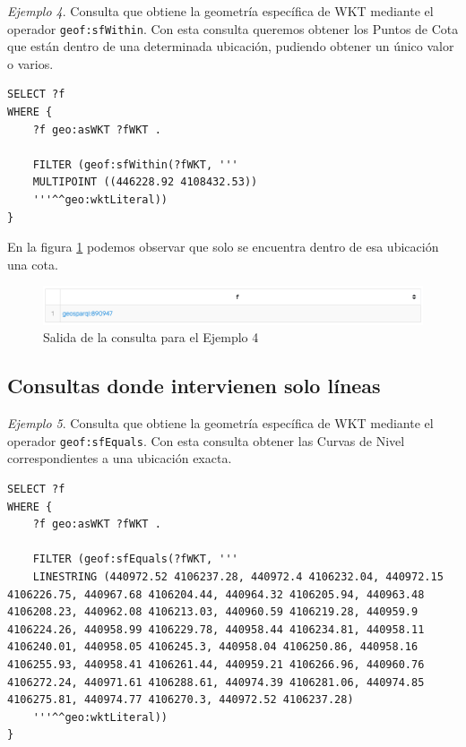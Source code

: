 \textit{Ejemplo 4}. Consulta que obtiene la geometría específica de WKT mediante el operador \texttt{geof:sfWithin}. Con esta consulta queremos obtener los Puntos de Cota que están dentro de una determinada ubicación, pudiendo obtener un único valor o varios. 

\vspace*{0.2cm}

\begin{lstlisting}
SELECT ?f
WHERE {
	?f geo:asWKT ?fWKT .
	
	FILTER (geof:sfWithin(?fWKT, '''
	MULTIPOINT ((446228.92 4108432.53))
	'''^^geo:wktLiteral))
} 
\end{lstlisting}

En la figura \ref{fig:salida7} podemos observar que solo se encuentra dentro de esa ubicación una cota.

\begin{figure}[H]
	\centering
	\includegraphics[width=1\linewidth]{imagenes/capitulo5/salida7}
	\caption{Salida de la consulta para el Ejemplo 4}
	\label{fig:salida7}
\end{figure}

\subsection{Consultas donde intervienen solo líneas}

\textit{Ejemplo 5}. Consulta que obtiene  la geometría específica de WKT mediante el operador \texttt{geof:sfEquals}. Con esta consulta obtener las Curvas de Nivel correspondientes a una ubicación exacta.

\vspace*{0.2cm}

\begin{lstlisting}
SELECT ?f
WHERE {
	?f geo:asWKT ?fWKT .
	
	FILTER (geof:sfEquals(?fWKT, '''
	LINESTRING (440972.52 4106237.28, 440972.4 4106232.04, 440972.15 4106226.75, 440967.68 4106204.44, 440964.32 4106205.94, 440963.48 4106208.23, 440962.08 4106213.03, 440960.59 4106219.28, 440959.9 4106224.26, 440958.99 4106229.78, 440958.44 4106234.81, 440958.11 4106240.01, 440958.05 4106245.3, 440958.04 4106250.86, 440958.16 4106255.93, 440958.41 4106261.44, 440959.21 4106266.96, 440960.76 4106272.24, 440971.61 4106288.61, 440974.39 4106281.06, 440974.85 4106275.81, 440974.77 4106270.3, 440972.52 4106237.28)
	'''^^geo:wktLiteral))
} 
\end{lstlisting}

